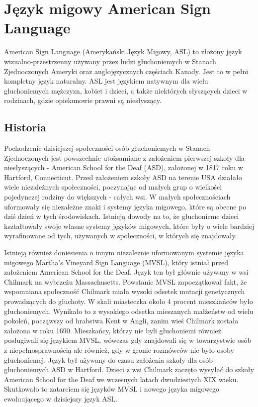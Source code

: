 \documentclass[a4paper,12pt,oneside]{book} %
\begin{document}
\chapter{Język migowy American Sign Language}
American Sign Language (Amerykański Język Migowy, ASL) to złożony język wizualno-przestrzenny używany przez ludzi głuchoniemych w Stanach Zjednoczonych Ameryki oraz anglojęzycznych częściach Kanady. Jest to w pełni kompletny język naturalny. ASL jest językiem natywnym dla wielu głuchoniemych mężczyzn, kobiet i dzieci, a także niektórych słyszących dzieci w rodzinach, gdzie opiekunowie prawni są niesłyszący\cite{nakamura}.
\section{Historia}
Pochodzenie dzisiejszej społeczności osób głuchoniemych w Stanach Zjednoczonych jest powszechnie utożsamiane z założeniem pierwszej szkoły dla niesłyszących - American School for the Deaf (ASD), założonej w 1817 roku w Hartford, Connecticut. Przed założeniem szkoły ASD na terenie USA działało wiele niezależnych społeczności, poczynając od małych grup o wielkości pojedynczej rodziny do większych - całych wsi. W małych społecznościach uformowały się niezależne znaki i systemy języka migowego, które są obecne po dziś dzień w tych środowiskach. Istnieją dowody na to, że głuchonieme dzieci kształtowały swoje własne systemy języków migowych, które były o wiele bardziej wyrafinowane od tych, używanych w społeczności, w których się znajdowały.\cite{bahan}

Istnieją również doniesienia o innym niezależnie uformowanym systemie języka migowego Martha’s Vineyard Sign Language (MVSL), który istniał przed założeniem American School for the Deaf. Język ten był głównie używany w wsi Chilmark na wybrzeżu Massachusetts. Powstanie MVSL zapoczątkował fakt, że wspomniana społeczność Chilmark miała wysoki odsetek mutacji genetycznych prowadzących do głuchoty. W skali miasteczka około 4 procent mieszkańców było głuchoniemych. Wynikało to z wysokiego odsetka mieszanych małżeństw od wielu pokoleń, począwszy od hrabstwa Kent w Angli, zanim wieś Chilmark została założona w roku 1690.\cite{groce} Mieszkańcy, którzy nie byli głuchoniemi również posługiwali się językiem MVSL, wówczas gdy znajdowali się w towarzystwie osób z niepełnosprawnością ale również, gdy w gronie rozmówców nie było osoby głuchoniemej. Język był używany do czasu założenia szkoły dla osób głuchoniemych ASD w Hartford. Dzieci z wsi Chilmark zaczęto wysyłać do szkoły American School for the Deaf we wczesnych latach dwudziestych XIX wieku. Skutkowało to zatarciem się języków MVSL i nowego języka migowego ewoluującego w dzisiejszy język ASL.\cite{bahan}
\end{document}
